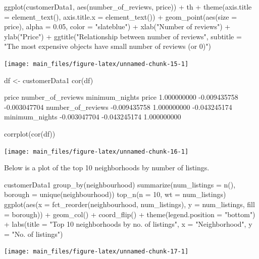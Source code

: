 \begin{Schunk}
\begin{Sinput}
ggplot(customerData1, aes(number_of_reviews, price)) +
  th + theme(axis.title = element_text(), axis.title.x = element_text()) +
  geom_point(aes(size = price), alpha = 0.05, color = "slateblue") +
  xlab("Number of reviews") +
  ylab("Price") +
  ggtitle("Relationship between number of reviews",
          subtitle = "The most expensive objects have small number of reviews (or 0)")
\end{Sinput}


\begin{center}\texttt{[image: main\_files/figure-latex/unnamed-chunk-15-1]} \end{center}

\end{Schunk}

\begin{Schunk}
\begin{Sinput}
df  <- customerData1  %
cor(df)
\end{Sinput}
\begin{Soutput}
                         price number_of_reviews minimum_nights
price              1.000000000      -0.009435758   -0.003047704
number_of_reviews -0.009435758       1.000000000   -0.043245174
minimum_nights    -0.003047704      -0.043245174    1.000000000
\end{Soutput}
\begin{Sinput}
corrplot(cor(df))
\end{Sinput}


\begin{center}\texttt{[image: main\_files/figure-latex/unnamed-chunk-16-1]} \end{center}

\end{Schunk}

Below is a plot of the top 10 neighborhoods by number of listings.

\begin{Schunk}
\begin{Sinput}
customerData1 %
    group_by(neighbourhood) %
    summarize(num_listings = n(), 
              borough = unique(neighbourhood)) %
    top_n(n = 10, wt = num_listings) %
    ggplot(aes(x = fct_reorder(neighbourhood, num_listings), 
               y = num_listings, fill = borough)) +
    geom_col() +
    coord_flip() +
    theme(legend.position = "bottom") +
    labs(title = "Top 10 neighborhoods by no. of listings",
         x = "Neighborhood", y = "No. of listings")
\end{Sinput}


\begin{center}\texttt{[image: main\_files/figure-latex/unnamed-chunk-17-1]} \end{center}

\end{Schunk}

